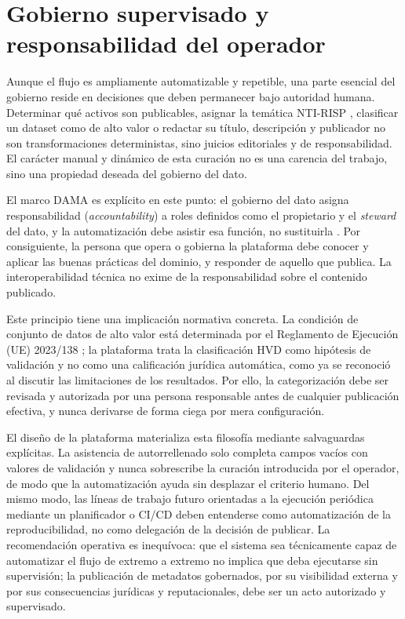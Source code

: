 \section{Gobierno supervisado y responsabilidad del operador}\label{sec:gobierno-supervisado}

Aunque el flujo es ampliamente automatizable y repetible, una parte esencial del gobierno reside en decisiones que deben permanecer bajo autoridad humana. Determinar qué activos son publicables, asignar la temática NTI-RISP \cite{datosGobNtiRisp}, clasificar un dataset como de alto valor o redactar su título, descripción y publicador no son transformaciones deterministas, sino juicios editoriales y de responsabilidad. El carácter manual y dinámico de esta curación no es una carencia del trabajo, sino una propiedad deseada del gobierno del dato.

El marco DAMA es explícito en este punto: el gobierno del dato asigna responsabilidad (\emph{accountability}) a roles definidos como el propietario y el \emph{steward} del dato, y la automatización debe asistir esa función, no sustituirla \cite{damaDmbok,datosGobDama2021}. Por consiguiente, la persona que opera o gobierna la plataforma debe conocer y aplicar las buenas prácticas del dominio, y responder de aquello que publica. La interoperabilidad técnica no exime de la responsabilidad sobre el contenido publicado.

Este principio tiene una implicación normativa concreta. La condición de conjunto de datos de alto valor está determinada por el Reglamento de Ejecución (UE) 2023/138 \cite{euHvdRegulation}; la plataforma trata la clasificación HVD como hipótesis de validación y no como una calificación jurídica automática, como ya se reconoció al discutir las limitaciones de los resultados. Por ello, la categorización debe ser revisada y autorizada por una persona responsable antes de cualquier publicación efectiva, y nunca derivarse de forma ciega por mera configuración.

El diseño de la plataforma materializa esta filosofía mediante salvaguardas explícitas. La asistencia de autorrellenado solo completa campos vacíos con valores de validación y nunca sobrescribe la curación introducida por el operador, de modo que la automatización ayuda sin desplazar el criterio humano. Del mismo modo, las líneas de trabajo futuro orientadas a la ejecución periódica mediante un planificador o CI/CD deben entenderse como automatización de la reproducibilidad, no como delegación de la decisión de publicar. La recomendación operativa es inequívoca: que el sistema sea técnicamente capaz de automatizar el flujo de extremo a extremo no implica que deba ejecutarse sin supervisión; la publicación de metadatos gobernados, por su visibilidad externa y por sus consecuencias jurídicas y reputacionales, debe ser un acto autorizado y supervisado.
